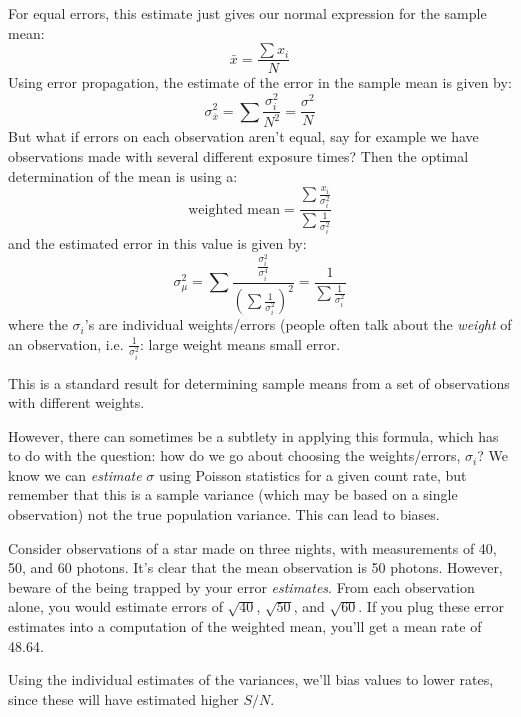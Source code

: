 \documentclass[12pt]{article}
\begin{document}
For equal errors, this estimate just gives our normal expression for
the sample mean:
    $$ \bar{x} = \frac{\sum x_i}{N} $$
Using error propagation, the estimate of the error in the sample mean
is given by:
    $$ \sigma_{\bar{x}}^2 = \sum\frac{\sigma_i^2}{N^2} 
       = \frac{\sigma^2}{N}$$
But what if errors on each observation aren't equal, say for example
we have observations made with several different exposure times? Then
the optimal determination of the mean is using a:
    $$ \textrm{weighted\ mean} = \frac{\sum\frac{x_i}{\sigma_i^2}}
       {\sum\frac{1}{\sigma_i^2}} $$
and the estimated error in this value is given by: 
    $$ \sigma_{\mu}^2 = \sum\frac{\frac{\sigma_i^2}{\sigma_i^4}}
       {(\sum\frac{1}{\sigma_i^2})^2}
       = \frac{1}{\sum\frac{1}{\sigma_i^2}}$$
where the $\sigma_i$'s are individual weights/errors
(people often talk about the \emph{weight} of an observation, i.e.
$\frac{1}{\sigma_i^2}$: large weight means small error.

This is a standard result for determining sample means from a set of
observations with different weights.

However, there can sometimes be a subtlety in applying this formula,
which has to do with the question: how do we go about choosing the
weights/errors, $\sigma_i$? We know we can \emph{estimate} $\sigma$
using Poisson statistics for a given count rate, but remember that
this is a sample variance (which may be based on a single
observation) not the true population variance. This can lead to
biases.

Consider observations of a star made on three nights, with
measurements of 40, 50, and 60 photons. It's clear that the mean
observation is 50 photons. However, beware of the being trapped by
your error \emph{estimates}. From each observation alone, you would estimate
errors of $\sqrt{40}$, $\sqrt{50}$, and $\sqrt{60}$. If you
plug these error estimates into a computation of the weighted mean,
you'll get a mean rate of 48.64.

Using the individual estimates of the variances, we'll bias values to
lower rates, since these will have estimated higher $S/N$.
\end{document}
